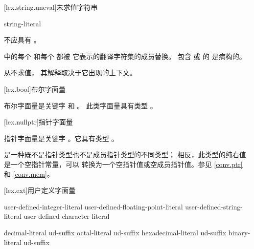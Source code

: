 [lex.string.uneval]{未求值字符串}

\begin{bnf}
\br
    string-literal
\end{bnf}

\pnum
{} 不应具有 。

\pnum
{} 中的每个  和每个  都被
它表示的翻译字符集的成员替换。
包含
 或
 的
是病构的。

\pnum
{} 从不求值，
其解释取决于它出现的上下文。

[lex.bool]{布尔字面量}

%
\begin{bnf}
\br
    \br
\end{bnf}

\pnum
{}%
布尔字面量是关键字  和 。
此类字面量具有类型 。

[lex.nullptr]{指针字面量}

%
\begin{bnf}
\br
\end{bnf}

\pnum
指针字面量是关键字 。它具有类型
。
\begin{note}
 是一种既不是指针类型也不是成员指针类型的不同类型；
相反，此类型的纯右值是一个空指针常量，可以
转换为一个空指针值或空成员指针值。参见 \ref{conv.ptr}
和 \ref{conv.mem}。
\end{note}

[lex.ext]{用户定义字面量}

%
\begin{bnf}
\br
    user-defined-integer-literal\br
    user-defined-floating-point-literal\br
    user-defined-string-literal\br
    user-defined-character-literal
\end{bnf}

\begin{bnf}
\br
    decimal-literal ud-suffix\br
    octal-literal ud-suffix\br
    hexadecimal-literal ud-suffix\br
    binary-literal ud-suffix
\end{bnf}

